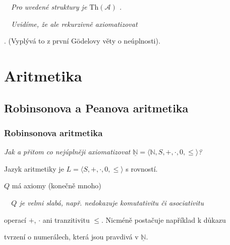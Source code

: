     {\bf {}}\ \ {\it Pro uvedené struktury je $\mathrm{Th}(\mathcal{A})$ .}
    \medskip
    
    \smallskip
    
    {\it {}\ \ Uvidíme, že ale  rekurzivně axiomatizovat
    \smallskip
    
    . (Vyplývá to z první Gödelovy věty o neúplnosti).}
    



\section{Aritmetika}\todo



\subsection{Robinsonova a Peanova aritmetika}\todo

\subsubsection*{Robinsonova aritmetika}
    {\it Jak  a přitom co nejúplněji axiomatizovat $\underline{\mathbb{N}}=\langle \mathbb{N},S,+,\cdot,0,\le\rangle$?}
    \medskip
    
    Jazyk aritmetiky je $L=\langle S,+,\cdot,0,\le \rangle$ s rovností.
    \medskip
    
     $Q$ má axiomy (konečně mnoho)

    

    {\it {}\ \ $Q$ je velmi slabá, např. nedokazuje komutativitu či asociativitu
    \smallskip
    
    operací $+$, $\cdot$ ani tranzitivitu $\le$. Nicméně postačuje například k důkazu
    \smallskip
    
     tvrzení o numerálech, která jsou pravdivá v $\underline{\mathbb{N}}$.}
    \medskip
    
